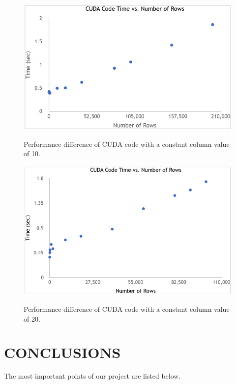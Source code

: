 \documentclass[letterpaper, 10 pt, conference]{ieeeconf}  %
\begin{document}
	\begin{figure}[thpb]
		\centering
		\includegraphics[width=\linewidth]{cudarow10.png}
		\label{fig:row10}
		\caption{Performance difference of CUDA code with a constant column value of 10.}
	\end{figure}
	\begin{figure}[thpb]
		\centering
		\includegraphics[width=\linewidth]{cudarow20.png}
		\label{fig:row20}
		\caption{Performance difference of CUDA code with a constant column value of 20.}
	\end{figure}	

\section{CONCLUSIONS}

The most important points of our project are listed below.
\end{document}
